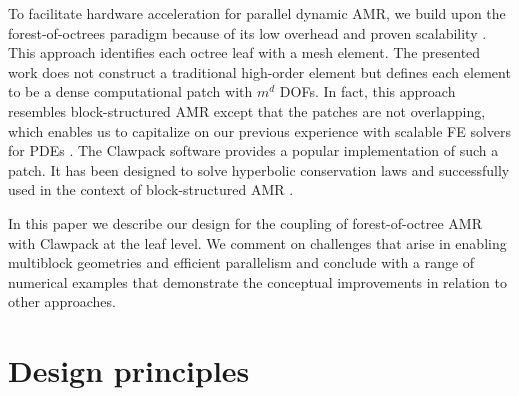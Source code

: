 \documentclass{IOS-Book-Article}     %
\newcommand{\comment}[1]{\textcolor{green}{[DAC: #1]}\xspace}
\newcommand{\clawpack}{{\sc Clawpack}\xspace}
\begin{document}
To facilitate hardware acceleration for parallel dynamic AMR, we
build upon the forest-of-octrees paradigm because of its low overhead
and proven scalability \cite{BursteddeWilcoxGhattas11}.  This approach
identifies each octree leaf with a mesh element.  The presented work does not
construct a traditional high-order element but defines each element to be a
dense computational patch with $m^d$ DOFs.  In fact, this approach
resembles block-structured AMR \cite{be-ol:1984, be-co:1989,
ColellaGravesKeenEtAl07,
BerzinsLuitjensMengEtAl10} except that the
patches are not overlapping,
which enables us to capitalize on our
previous experience with scalable FE solvers for PDEs
\cite{BursteddeStadlerAlisicEtAl13}.  The \clawpack software
\cite{LeVeque97} provides a popular implementation of such a patch.
It has been designed to solve hyperbolic conservation laws
and successfully used in the context of block-structured AMR
\cite{be-le:1991, amrclaw, Berger:2011du}.

In this paper we describe our design for the coupling of forest-of-octree AMR
with \clawpack at the leaf level.  We comment on challenges that arise in
enabling multiblock geometries and efficient parallelism and conclude with a range
of numerical examples that demonstrate the conceptual improvements in relation
to other approaches.

\section{Design principles}
\end{document}
